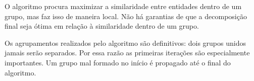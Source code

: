 O algoritmo procura maximizar a similaridade entre
entidades dentro de um grupo, mas faz isso de maneira local. Não há 
garantias de que a decomposição final seja ótima em relação à similaridade
dentro de um grupo. 

Os agrupamentos realizados pelo algoritmo são definitivos: dois grupos 
unidos jamais serão separados. Por essa razão as primeiras iterações
são especialmente importantes. Um grupo mal formado no início é propagado
até o final do algoritmo.


%
%
%

% 
% 
% 
% 
% 
% 
% 
% 



